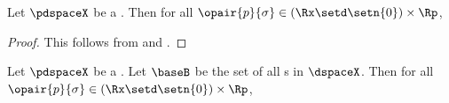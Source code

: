\begin{corollary}
\label{cor:tspace_openball}
Let $\pdspaceX$ be a .
Then for all $\opair{p}{\sigma}\in(\Rx\setd\setn{0})\times\Rp$,
\end{corollary}
\begin{proof}
This follows from  and .
\end{proof}

\begin{corollary}
\label{cor:tspace_base}
Let $\pdspaceX$ be a .
Let $\baseB$ be the set of all s in $\dspaceX$.
Then for all $\opair{p}{\sigma}\in(\Rx\setd\setn{0})\times\Rp$,
\end{corollary}
